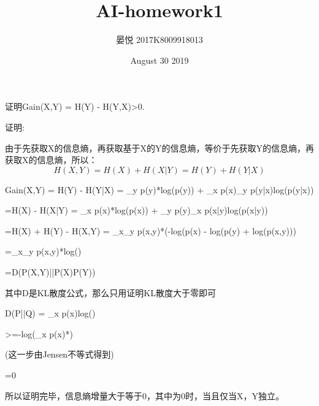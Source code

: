 \documentclass{ctexart}
\title{AI-homework1}
\author{晏悦 2017K8009918013}
\date{August 30 2019}
\begin{document}
\maketitle
证明Gain(X,Y) = H(Y) - H(Y,X)>0.

证明:

由于先获取X的信息熵，再获取基于X的Y的信息熵，等价于先获取Y的信息熵，再获取X的信息熵，所以：
\[H(X,Y) = H(X) + H(X|Y) = H(Y) + H(Y|X)\]

Gain(X,Y) = H(Y) - H(Y|X) = \Sigma_y p(y)*log(p(y)) + \Sigma_x p(x)\Sigma _y p(y|x)log(p(y|x))

=H(X) - H(X|Y) = \Sigma_x p(x)*log(p(x)) + \Sigma_y p(y)\Sigma _x p(x|y)log(p(x|y))

=H(X) + H(Y) - H(X,Y) = \Sigma_x\Sigma_y p(x,y)*(-log(p(x) - log(p(y) + log(p(x,y)))

=\Sigma_x\Sigma_y p(x,y)*log()

=D(P(X,Y)||P(X)P(Y))

其中D是KL散度公式，那么只用证明KL散度大于零即可

D(P||Q) = \Sigma_x p(x)log()

>=-log(\Sigma_x p(x)*)

(这一步由Jensen不等式得到)

=0

所以证明完毕，信息熵增量大于等于0，其中为0时，当且仅当X，Y独立。
\end{document}
